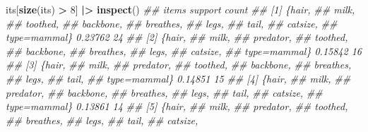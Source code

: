 \documentclass[
  notitlepage]{book}
\newenvironment{Shaded}{\begin{snugshade}}{\end{snugshade}}
\newcommand{\CommentTok}[1]{\textcolor[rgb]{0.56,0.35,0.01}{\textit{#1}}}
\newcommand{\DecValTok}[1]{\textcolor[rgb]{0.00,0.00,0.81}{#1}}
\newcommand{\ErrorTok}[1]{\textcolor[rgb]{0.64,0.00,0.00}{\textbf{#1}}}
\newcommand{\KeywordTok}[1]{\textcolor[rgb]{0.13,0.29,0.53}{\textbf{#1}}}
\newcommand{\NormalTok}[1]{#1}
\newcommand{\OperatorTok}[1]{\textcolor[rgb]{0.81,0.36,0.00}{\textbf{#1}}}
\newcommand{\StringTok}[1]{\textcolor[rgb]{0.31,0.60,0.02}{#1}}
\begin{document}
\begin{Shaded}
\begin{Highlighting}[]
\NormalTok{its[}\KeywordTok{size}\NormalTok{(its) }\OperatorTok{\textgreater{}}\StringTok{ }\DecValTok{8}\NormalTok{] }\OperatorTok{|}\ErrorTok{\textgreater{}}\StringTok{ }\KeywordTok{inspect}\NormalTok{()}
\CommentTok{\#\#      items         support count}
\CommentTok{\#\# [1]  \{hair,                     }
\CommentTok{\#\#       milk,                     }
\CommentTok{\#\#       toothed,                  }
\CommentTok{\#\#       backbone,                 }
\CommentTok{\#\#       breathes,                 }
\CommentTok{\#\#       legs,                     }
\CommentTok{\#\#       tail,                     }
\CommentTok{\#\#       catsize,                  }
\CommentTok{\#\#       type=mammal\} 0.23762    24}
\CommentTok{\#\# [2]  \{hair,                     }
\CommentTok{\#\#       milk,                     }
\CommentTok{\#\#       predator,                 }
\CommentTok{\#\#       toothed,                  }
\CommentTok{\#\#       backbone,                 }
\CommentTok{\#\#       breathes,                 }
\CommentTok{\#\#       legs,                     }
\CommentTok{\#\#       catsize,                  }
\CommentTok{\#\#       type=mammal\} 0.15842    16}
\CommentTok{\#\# [3]  \{hair,                     }
\CommentTok{\#\#       milk,                     }
\CommentTok{\#\#       predator,                 }
\CommentTok{\#\#       toothed,                  }
\CommentTok{\#\#       backbone,                 }
\CommentTok{\#\#       breathes,                 }
\CommentTok{\#\#       legs,                     }
\CommentTok{\#\#       tail,                     }
\CommentTok{\#\#       type=mammal\} 0.14851    15}
\CommentTok{\#\# [4]  \{hair,                     }
\CommentTok{\#\#       milk,                     }
\CommentTok{\#\#       predator,                 }
\CommentTok{\#\#       backbone,                 }
\CommentTok{\#\#       breathes,                 }
\CommentTok{\#\#       legs,                     }
\CommentTok{\#\#       tail,                     }
\CommentTok{\#\#       catsize,                  }
\CommentTok{\#\#       type=mammal\} 0.13861    14}
\CommentTok{\#\# [5]  \{hair,                     }
\CommentTok{\#\#       milk,                     }
\CommentTok{\#\#       predator,                 }
\CommentTok{\#\#       toothed,                  }
\CommentTok{\#\#       breathes,                 }
\CommentTok{\#\#       legs,                     }
\CommentTok{\#\#       tail,                     }
\CommentTok{\#\#       catsize,                  }

\end{Highlighting}
\end{Shaded}
\end{document}
